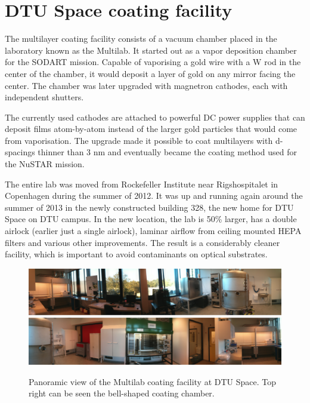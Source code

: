 \chapter{DTU Space coating facility}\label{chap:coating_facility}

The multilayer coating facility consists of a vacuum chamber placed in the laboratory known as the Multilab. It started out as a vapor deposition chamber for the SODART mission\cite{Christensen:1997kk,Schnopper:1994ip}. Capable of vaporising a gold wire with a W rod in the center of the chamber, it would deposit a layer of gold on any mirror facing the center. The chamber was later upgraded with magnetron cathodes, each with independent shutters.

The currently used cathodes are attached to powerful DC power supplies that can deposit films atom-by-atom instead of the larger gold particles that would come from vaporisation. The upgrade made it possible to coat multilayers with d-spacings thinner than 3 nm and eventually became the coating method used for the NuSTAR mission.

The entire lab was moved from Rockefeller Institute near Rigshospitalet in Copenhagen during the summer of 2012. It was up and running again around the summer of 2013 in the newly constructed building 328, the new home for DTU Space on DTU campus. In the new location, the lab is 50\% larger, has a double airlock (earlier just a single airlock), laminar airflow from ceiling mounted HEPA filters and various other improvements. The result is a considerably cleaner facility, which is important to avoid contaminants on optical substrates.

\begin{figure}[htbp]
  \centering
  \includegraphics[width=\linewidth]{figures/chamber/multilab1.png}
  \includegraphics[width=\linewidth]{figures/chamber/multilab2.png}
  \caption{\footnotesize Panoramic view of the Multilab coating facility at DTU Space. Top right can be seen the bell-shaped coating chamber.}
  \label{fig:multilab}
\end{figure}

